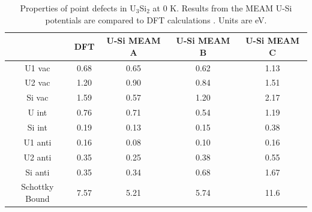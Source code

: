 \documentclass[review]{elsarticle}
\begin{document}
\begin{table}[h!]
\caption{Properties of point defects in U$_{3}$Si$_{2}$ at 0 K.  Results from the MEAM U-Si potentials are compared to DFT calculations \cite{middleburgh2016}.  Units are eV.}\label{tab:ben6}
\begin{center}
\begin{tabular}{|c|c|c|c|c|}
     \hline
      &  DFT & U-Si MEAM A & U-Si MEAM B & U-Si MEAM C\\
     \hline
     U1 vac & 0.68 & 0.65 & 0.62 & 1.13\\
     U2 vac & 1.20 & 0.90 &  0.84 & 1.51\\
     Si vac & 1.59 & 0.57 & 1.20 & 2.17\\
     U int & 0.76 & 0.71 & 0.54 & 1.19\\
     Si int & 0.19 & 0.13 & 0.15 & 0.38\\
     U1 anti & 0.16 & 0.08 & 0.10 & 0.16\\
     U2 anti & 0.35 & 0.25 & 0.38 & 0.55\\
     Si anti & 0.35 & 0.34 & 0.68 & 1.67\\
     Schottky Bound & 7.57 & 5.21 & 5.74 & 11.6 \\
     \hline
\end{tabular}
\end{center}
\label{default}
\end{table}%
\end{document}
